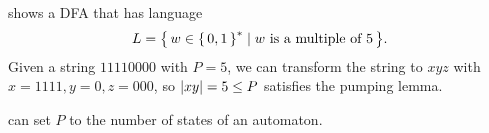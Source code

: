 
\begin{example}[]
    shows a DFA that has language
    \[
        L = { \left\{\, w \in { \left\{\,0,1\,\right\} }^* \mid w \text{ is a multiple of $5$} \,\right\} }
    .\]
    Given a string $11110000$ with $P = 5$,
    we can transform the string to $xyz$ with $x=1111, y=0, z=000$,
    so ${ \left\lvert xy \right\rvert } = 5 \le P$ satisfies the pumping lemma.

    can set $P$ to the number of states of an automaton.
\end{example}

